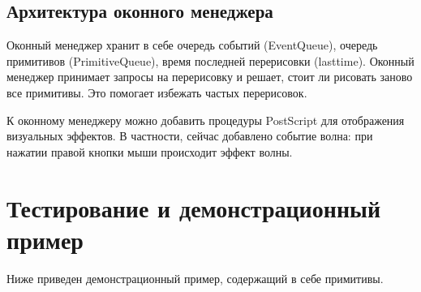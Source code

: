 \documentclass[14pt]{extarticle}
\begin{document}
	\subsection{ Архитектура оконного менеджера}
	Оконный менеджер хранит в себе очередь событий (EventQueue), очередь примитивов (PrimitiveQueue), время последней перерисовки (lasttime). Оконный менеджер принимает запросы на перерисовку и решает, стоит ли рисовать заново все примитивы. Это помогает избежать частых перерисовок.
	
	К оконному менеджеру можно добавить процедуры PostScript для отображения визуальных эффектов. В частности, сейчас добавлено событие волна: при нажатии правой кнопки мыши происходит эффект волны. 
	\pagebreak
	\section{Тестирование и демонстрационный пример}
	Ниже приведен демонстрационный пример, содержащий в себе примитивы.
 \linebreak

	\lstset{language=PostScript}          %
\end{document}
